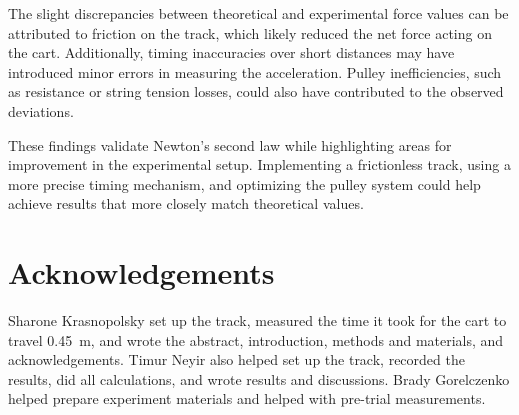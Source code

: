 ﻿\documentclass[reprint,amsmath,amssymb.aps]{revtex4-2}
\begin{document}
The slight discrepancies between theoretical and experimental force values can be attributed to friction on the track, which likely reduced the net force acting on the cart. Additionally, timing inaccuracies over short distances may have introduced minor errors in measuring the acceleration. Pulley inefficiencies, such as resistance or string tension losses, could also have contributed to the observed deviations.

These findings validate Newton’s second law while highlighting areas for improvement in the experimental setup. Implementing a frictionless track, using a more precise timing mechanism, and optimizing the pulley system could help achieve results that more closely match theoretical values.




\section{Acknowledgements}
Sharone Krasnopolsky set up the track, measured the time it took for the cart to travel \qty{0.45}{\meter}, and wrote the abstract, introduction, methods and materials, and acknowledgements. Timur Neyir also helped set up the track, recorded the results, did all calculations, and wrote results and discussions. Brady Gorelczenko helped prepare experiment materials and helped with pre-trial measurements. 







\end{document}
